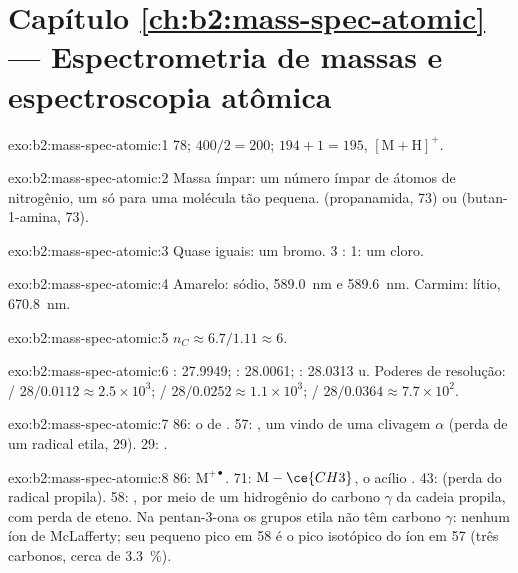 \section*{Capítulo \ref{ch:b2:mass-spec-atomic} --- Espectrometria de massas e espectroscopia atômica}

\begin{solution}{exo:b2:mass-spec-atomic:1}
78; $400/2 = 200$; $194 + 1 = 195$, $[\mathrm M + \mathrm H]^+$.
\end{solution}

\begin{solution}{exo:b2:mass-spec-atomic:2}
Massa ímpar: um número ímpar de átomos de nitrogênio, um só para uma molécula tão pequena. 
(propanamida, 73) ou  (butan-1-amina, 73).
\end{solution}

\begin{solution}{exo:b2:mass-spec-atomic:3}
Quase iguais: um bromo. 3 : 1: um cloro.
\end{solution}

\begin{solution}{exo:b2:mass-spec-atomic:4}
Amarelo: sódio, \qty{589.0}{nm} e \qty{589.6}{nm}. Carmim: lítio, \qty{670.8}{nm}.
\end{solution}

\begin{solution}{exo:b2:mass-spec-atomic:5}
$n_C \approx 6.7/1.11 \approx 6$.
\end{solution}

\begin{solution}{exo:b2:mass-spec-atomic:6}
: 27.9949; : 28.0061; : 28.0313 u. Poderes de resolução: / $28/0.0112
\approx 2.5 \times 10^3$; / $28/0.0252 \approx 1.1 \times 10^3$; /
$28/0.0364 \approx 7.7 \times 10^2$.
\end{solution}

\begin{solution}{exo:b2:mass-spec-atomic:7}
86: o  de . 57: , um  vindo de uma clivagem $\alpha$
(perda de um radical etila, 29). 29: .
\end{solution}

\begin{solution}{exo:b2:mass-spec-atomic:8}
86: $\mathrm M^{+\bullet}$. 71: $\mathrm M - \ce{CH3}$, o acílio . 43: 
(perda do radical propila). 58: , por meio de um hidrogênio do carbono
$\gamma$ da cadeia propila, com perda de eteno. Na pentan-3-ona os grupos etila não têm carbono
$\gamma$: nenhum íon de McLafferty; seu pequeno pico em 58 é o pico isotópico  do íon em 57
(três carbonos, cerca de 3.3~\%).
\end{solution}

